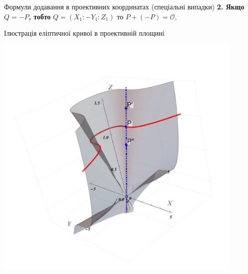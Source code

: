 \documentclass[9pt]{beamer}
\begin{document}
\begin{darkframes}
\begin{frame}{Формули додавання в проективних координатах (спеціальні випадки)}
  \vspace{0.5cm}
  \textbf{2. Якщо \(Q=-P\), тобто}
  $
  Q=(X_1:-Y_1:Z_1)
  $
  то
  $
  P + (-P) = \mathcal{O},
  $

\end{frame}


\begin{frame}{Ілюстрація еліптичної кривої в проективній площині}
    \begin{center}
    \includegraphics[width=0.9\textwidth]{resources/projective_ec.pdf}
    \end{center}
\end{frame}


  \end{darkframes}
\end{document}
